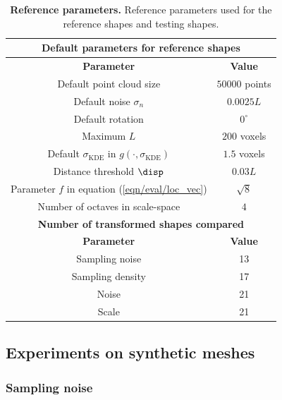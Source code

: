 \begin{table}[ht]
\centering
\begin{tabular}{|c|c|}
\hline
\multicolumn{2}{c}{ \textbf{Default parameters for reference shapes }} \\ 
\hline 
\textbf{Parameter} & \textbf{Value} \\
\hline
Default point cloud size & $50000$ points\\
Default noise $\sigma_{n}$ & $0.0025L$\\ 
Default rotation & $0^{\circ}$\\
Maximum $L$ & $200$ voxels\\
Default $\sigma_{\textrm{KDE}}$ in $g(\cdot,\sigma_{\textrm{KDE}})$ & $1.5$ voxels \\ 
Distance threshold $\disp$ & $0.03L$ \\
Parameter $f$ in equation (\ref{eqn/eval/loc_vec}) & $\sqrt{8}$ \\
Number of octaves in scale-space & $4$ \\
\hline
\multicolumn{2}{c}{ \textbf{ Number of transformed shapes compared }} \\
\hline 
\textbf{Parameter} & \textbf{Value} \\
\hline
Sampling noise & 13 \\
Sampling density & 17 \\
Noise & 21 \\
Scale & 21 \\
\hline
\end{tabular}
\caption{\textbf{Reference parameters.} Reference parameters used for the reference shapes and testing shapes.}
\label{tab/eval/referenceparam}
\end{table}

\subsection{Experiments on synthetic meshes}

\subsubsection{Sampling noise}

